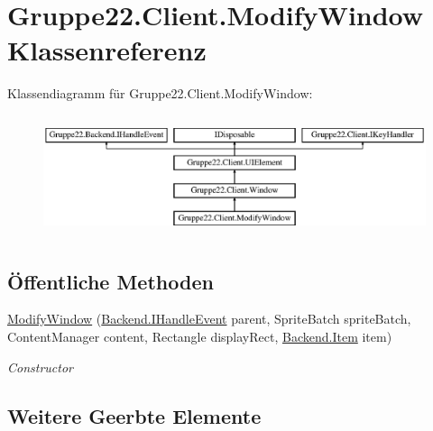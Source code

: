 \hypertarget{class_gruppe22_1_1_client_1_1_modify_window}{\section{Gruppe22.\-Client.\-Modify\-Window Klassenreferenz}
\label{class_gruppe22_1_1_client_1_1_modify_window}
}
Klassendiagramm für Gruppe22.\-Client.\-Modify\-Window\-:\begin{figure}[H]
\begin{center}
\leavevmode
\includegraphics[height=3.589744cm]{class_gruppe22_1_1_client_1_1_modify_window}
\end{center}
\end{figure}
\subsection*{Öffentliche Methoden}
\begin{DoxyCompactItemize}
\item 
\hyperlink{class_gruppe22_1_1_client_1_1_modify_window_a2ff4c3551990556ce8a2fd1ceb97f04f}{Modify\-Window} (\hyperlink{interface_gruppe22_1_1_backend_1_1_i_handle_event}{Backend.\-I\-Handle\-Event} parent, Sprite\-Batch sprite\-Batch, Content\-Manager content, Rectangle display\-Rect, \hyperlink{class_gruppe22_1_1_backend_1_1_item}{Backend.\-Item} item)
\begin{DoxyCompactList}\small\item\em Constructor \end{DoxyCompactList}\end{DoxyCompactItemize}
\subsection*{Weitere Geerbte Elemente}


